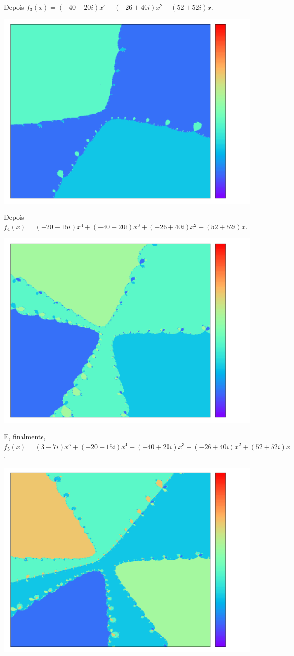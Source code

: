 \documentclass{article}
\begin{document}
Depois $f_3(x) = (-40+20i)x^3 + (-26+40i)x^2 + (52+52i)x$.  
\begin{center}\includegraphics[width=0.75\columnwidth]{expand_3} \end{center}
Depois $f_4(x) = (-20-15i)x^4 + (-40+20i)x^3 + (-26+40i)x^2 + (52+52i)x$.  
\begin{center}\includegraphics[width=0.75\columnwidth]{expand_4} \end{center}
E, finalmente, $f_5(x) = (3-7i)x^5 + (-20-15i)x^4 + (-40+20i)x^3 + (-26+40i)x^2 + (52+52i)x$.  
\begin{center}\includegraphics[width=0.75\columnwidth]{expand_5} \end{center}
\end{document}

